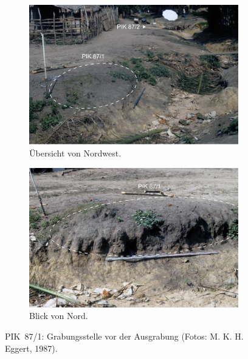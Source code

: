 \begin{figure}[!tb]
\centering
\begin{subfigure}[b]{\columnwidth}
\includegraphics[width = \textwidth]{fig/PIK87-1_E87-014-6.pdf}
\caption{Übersicht von Nordwest.}
 \label{fig:PIK87-1_FundstelleObfl_vonNO}
\end{subfigure}\hfill
\begin{subfigure}[b]{\columnwidth}
\includegraphics[width = \textwidth]{fig/PIK87-1_E87-014-3.pdf}
\caption{Blick von Nord.}
 \label{fig:PIK87-1_FundstelleObfl_vonN}
\end{subfigure}
 \caption{PIK~87/1: Grabungsstelle vor der Ausgrabung (Fotos: M. K. H. Eggert, 1987).}
 \label{fig:PIK87-1_FundstelleObfl_Foto}
\end{figure}


